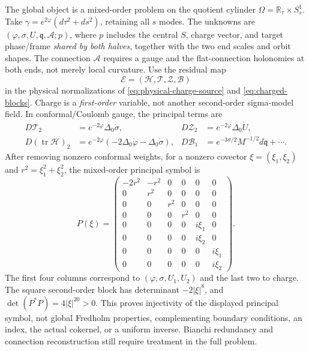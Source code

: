 \documentclass[a4paper,11pt]{article}
\numberwithin{equation}{section}
\theoremstyle{definition}
\newcommand{\tr}{\operatorname{tr}}
\newcommand{\R}{\mathbb R}
\begin{document}
The global object is a mixed-order problem on the quotient cylinder $\Omega=\R_\tau\times S^1_s$.
Take $\gamma=e^{2\varphi}(d\tau^2+ds^2)$, retaining all $s$ modes.
The unknowns are $(\varphi,\sigma,U,\mathfrak q,\mathcal A;p)$, where $p$ includes the central $S$, charge vector, and target phase/frame \emph{shared by both halves}, together with the two end scales and orbit shapes.
The connection $\mathcal A$ requires a gauge and the flat-connection holonomies at both ends, not merely local curvature.
Use the residual map
\[
 \mathscr E=(\mathscr H,\mathscr T,\mathscr Z,\mathscr B)
\]
in the physical normalizations of \eqref{eq:physical-charge-source} and \eqref{eq:charged-blocks}.
Charge is a \emph{first-order} variable, not another second-order sigma-model field.
In conformal/Coulomb gauge, the principal terms are
\begin{align}
 D\mathscr T_2&=e^{-2\varphi}\Delta_0\dot\sigma,&
 D\mathscr Z_2&=e^{-2\varphi}\Delta_0\dot U,\nonumber\\
 D(\tr\mathscr H)_2&=e^{-2\varphi}
       (-2\Delta_0\dot\varphi-\Delta_0\dot\sigma),&
 D\mathscr B_1&=e^{-3\sigma/2}M^{-1/2}d\dot{\mathfrak q}+\cdots.
\end{align}
After removing nonzero conformal weights, for a nonzero covector $\xi=(\xi_1,\xi_2)$ and $r^2=\xi_1^2+\xi_2^2$, the mixed-order principal symbol is
\[
 P(\xi)=
 \begin{pmatrix}
 -2r^2&-r^2&0&0&0&0\\
 0&r^2&0&0&0&0\\
 0&0&r^2&0&0&0\\
 0&0&0&r^2&0&0\\
 0&0&0&0&i\xi_1&0\\
 0&0&0&0&i\xi_2&0\\
 0&0&0&0&0&i\xi_1\\
 0&0&0&0&0&i\xi_2
 \end{pmatrix}.
\]
The first four columns correspond to $(\varphi,\sigma,U_1,U_2)$ and the last two to charge.
The square second-order block has determinant $-2|\xi|^8$, and $\det(P^*P)=4|\xi|^{20}>0$.
This proves injectivity of the displayed principal symbol, not global Fredholm properties, complementing boundary conditions, an index, the actual cokernel, or a uniform inverse.
Bianchi redundancy and connection reconstruction still require treatment in the full problem.
\end{document}
